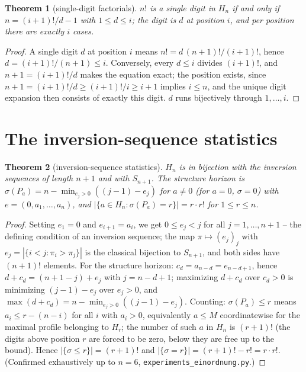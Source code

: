 \documentclass[11pt]{article}
\newtheorem{satz}{Theorem}[section]
\theoremstyle{definition}
\theoremstyle{remark}
\begin{document}
\begin{satz}[single-digit factorials]
$n!$ is a single digit in $H_n$ if and only if $n=(i{+}1)!/d-1$
with $1\le d\le i$; the digit is $d$ at position $i$, and per
position there are exactly $i$ cases.
\end{satz}

\begin{proof}
A single digit $d$ at position $i$ means $n!=d\,(n+1)!/(i+1)!$,
hence $d=(i+1)!/(n+1)\le i$. Conversely, every $d\le i$ divides
$(i+1)!$, and $n+1=(i+1)!/d$ makes the equation exact; the
position exists, since $n{+}1=(i{+}1)!/d\ge(i{+}1)!/i\ge
i{+}1$ implies $i\le n$, and the unique digit expansion then
consists of exactly this digit.
$d$ runs bijectively through $1,\ldots,i$.
\end{proof}


\section{The inversion-sequence statistics}\label{app:inv}

\begin{satz}[inversion-sequence statistics]
$H_n$ is in bijection with the inversion sequences of length
$n{+}1$ and with $S_{n+1}$. The structure horizon is
$\sigma(P_a)=n-\min_{e_j>0}((j{-}1)-e_j)$ for $a\ne0$ (for $a=0$,
$\sigma=0$) with $e=(0,a_1,\ldots,a_n)$, and
$|\{a\in H_n:\sigma(P_a)=r\}|=r\cdot r!$ for $1\le r\le n$.
\end{satz}

\begin{proof}
Setting $e_1=0$ and $e_{i+1}=a_i$, we get $0\le e_j<j$ for all
$j=1,\ldots,n{+}1$ -- the defining condition of an inversion
sequence; the map $\pi\mapsto(e_j)_j$ with
$e_j=|\{i<j:\pi_i>\pi_j\}|$ is the classical bijection to
$S_{n+1}$, and both sides have $(n{+}1)!$ elements. For the
structure horizon: $c_d=a_{n-d}=e_{n-d+1}$, hence
$d+c_d=(n{+}1-j)+e_j$ with $j=n-d+1$; maximizing $d+c_d$ over
$c_d>0$ is minimizing $(j{-}1)-e_j$ over $e_j>0$, and
$\max(d+c_d)=n-\min_{e_j>0}((j{-}1)-e_j)$. Counting:
$\sigma(P_a)\le r$
means $a_i\le r-(n-i)$ for all $i$ with $a_i>0$, equivalently
$a\le M$ coordinatewise for the maximal profile belonging to
$H_r$; the number of such $a$ in $H_n$ is $(r{+}1)!$ (the digits
above position $r$ are forced to be zero, below they are free up
to the bound). Hence $|\{\sigma\le r\}|=(r{+}1)!$ and
$|\{\sigma=r\}|=(r{+}1)!-r!=r\cdot r!$. (Confirmed exhaustively
up to $n=6$, \texttt{experiments\_einordnung.py}.)
\end{proof}
\end{document}
